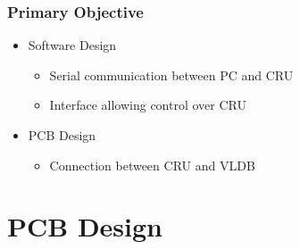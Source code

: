 \documentclass[aspectratio=43]{beamer}
\makeatletter
\newenvironment{backgroundblock}[2]{%
  \global\setbox\@backgroundblock=\vbox\bgroup%
    \unvbox\@backgroundblock%
    \vbox to0pt\bgroup\vskip#2\hbox to0pt\bgroup\hskip#1\relax%
}{\egroup\egroup\egroup}
\makeatother
\begin{document}
{


\begin{frame}
\frametitle{Primary Objective}

\begin{itemize}
\item Software Design
	\begin{itemize}
	\item Serial communication between PC and CRU
	\item Interface allowing control over CRU
	\end{itemize}
\item PCB Design
	\begin{itemize}
	\item Connection between CRU and VLDB 
	\end{itemize}
\end{itemize}
\end{frame}


\section{PCB Design}
}
\end{document}
